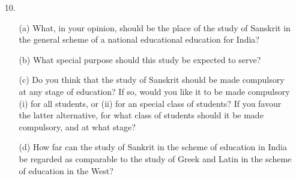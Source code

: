 {\rm 
\begin{itemize}
\item[10.] \begin{itemize}
           \item[(a)] What, in your opinion, should be the place of the study of Sanskrit in the general scheme of a national educational education for India?
           
           \item[(b)] What special purpose should this study be expected to serve?
           
           \item[(c)] Do you think that the study of Sanskrit should be made compulsory at any stage of education? If so, would you like it to be made compulsory (i) for all students, or (ii) for an special class of students? If you favour the latter alternative, for what class of students should it be made compulsory, and at what stage?
           
           \item[(d)] How far can the study of Sankrit in the scheme of education in India be regarded as comparable to the study of Greek and Latin in the scheme of education in the West?
           \end{itemize}
\end{itemize}
}


